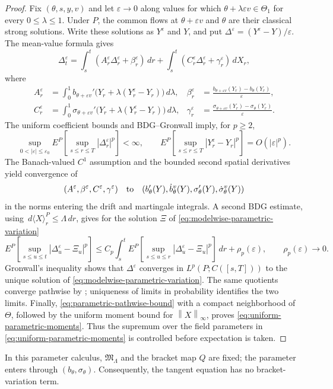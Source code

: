 \documentclass[11pt,reqno]{amsart}
\theoremstyle{plain}
\theoremstyle{definition}
\newcommand{\eps}{\varepsilon}
\newcommand{\dd}{\,d}
\newcommand{\norm}[1]{\left\lVert #1\right\rVert}
\begin{document}
\begin{proof}
Fix \((\theta,s,y,v)\) and let \(\eps\to0\) along values for which
\(\theta+\lambda\eps v\in\Theta_1\) for every \(0\le\lambda\le1\).  Under
\(P\), the common flows at
\(\theta+\eps v\) and \(\theta\) are their classical strong solutions.
Write these solutions as \(Y^\eps\) and \(Y\), and put
\(\Delta^\eps=(Y^\eps-Y)/\eps\).  The mean-value formula gives
\[
  \Delta_t^\eps
  =\int_s^t(A_r^\eps\Delta_r^\eps+\beta_r^\eps)\dd r
   +\int_s^t(C_r^\eps\Delta_r^\eps+\gamma_r^\eps)\dd X_r,
\]
where
\begin{align*}
A_r^\eps
&=\int_0^1 b_{\theta+\eps v}'
  \bigl(Y_r+\lambda(Y_r^\eps-Y_r)\bigr)\dd\lambda,
&
\beta_r^\eps
&=\frac{b_{\theta+\eps v}(Y_r)-b_\theta(Y_r)}{\eps},
\\
C_r^\eps
&=\int_0^1 \sigma_{\theta+\eps v}'
  \bigl(Y_r+\lambda(Y_r^\eps-Y_r)\bigr)\dd\lambda,
&
\gamma_r^\eps
&=\frac{\sigma_{\theta+\eps v}(Y_r)-\sigma_\theta(Y_r)}{\eps}.
\end{align*}
The uniform coefficient bounds and BDG--Gronwall imply, for \(p\ge2\),
\[
  \sup_{0<|\eps|\le\eps_0}
  E^P\!\left[\sup_{s\le r\le T}|\Delta_r^\eps|^p\right]<\infty,
  \qquad
  E^P\!\left[\sup_{s\le r\le T}|Y_r^\eps-Y_r|^p\right]
  =O(|\eps|^p).
\]
The Banach-valued \(C^1\) assumption and the bounded second spatial
derivatives yield convergence of
\[
  (A^\eps,\beta^\eps,C^\eps,\gamma^\eps)
  \quad\hbox{to}\quad
  (b_\theta'(Y),\dot b_\theta^v(Y),
   \sigma_\theta'(Y),\dot\sigma_\theta^v(Y))
\]
in the norms entering the drift and martingale integrals.  A second
BDG estimate, using
\(\dd\langle X\rangle_r^P\le\Lambda\dd r\), gives for the solution
\(\Xi\) of \eqref{eq:modelwise-parametric-variation}
\[
 E^P\!\left[\sup_{s\le u\le t}|\Delta_u^\eps-\Xi_u|^p\right]
 \le C_p\int_s^t
 E^P\!\left[\sup_{s\le u\le r}|\Delta_u^\eps-\Xi_u|^p\right]\dd r
 +\rho_p(\eps),
 \qquad \rho_p(\eps)\longrightarrow0.
\]
Gronwall's inequality shows that \(\Delta^\eps\) converges in
\(L^p(P;C([s,T]))\) to the unique solution of
\eqref{eq:modelwise-parametric-variation}.  The same quotients converge
pathwise by ; uniqueness of limits in
probability identifies the two limits.  Finally,
\eqref{eq:parametric-pathwise-bound} with a compact neighborhood of
\(\Theta\), followed by the uniform moment bound for \(\norm X_\infty\),
proves \eqref{eq:uniform-parametric-moments}.  Thus the supremum over the
field parameters in \eqref{eq:uniform-parametric-moments} is controlled
before expectation is taken.
\end{proof}

In this parameter calculus, \(\mathfrak M_\Lambda\) and the bracket map
\(Q\) are fixed; the parameter enters through \((b_\theta,\sigma_\theta)\).
Consequently, the tangent equation has no bracket-variation term.
\end{document}

